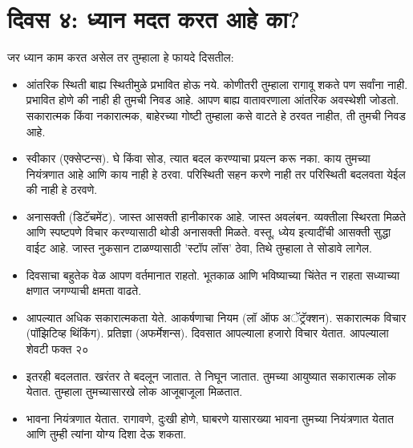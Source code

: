 \section*{दिवस ४: ध्यान मदत करत आहे का?}
जर ध्यान काम करत असेल तर तुम्हाला हे फायदे दिसतील:
\begin{itemize}
 \item आंतरिक स्थिती बाह्य स्थितीमुळे प्रभावित होऊ नये. कोणीतरी तुम्हाला रागावू शकते पण सर्वांना नाही. प्रभावित होणे की नाही ही तुमची निवड आहे. आपण बाह्य वातावरणाला आंतरिक अवस्थेशी जोडतो. सकारात्मक किंवा नकारात्मक, बाहेरच्या गोष्टी तुम्हाला कसे वाटते हे ठरवत नाहीत, ती तुमची निवड आहे.
 \item स्वीकार (एक्सेप्टन्स). घे किंवा सोड, त्यात बदल करण्याचा प्रयत्न करू नका. काय तुमच्या नियंत्रणात आहे आणि काय नाही हे ठरवा. परिस्थिती सहन करणे नाही तर परिस्थिती बदलवता येईल की नाही हे ठरवणे.
 \item  अनासक्ती (डिटॅचमेंट). जास्त आसक्ती हानीकारक आहे. जास्त अवलंबन. व्यक्तीला स्थिरता मिळते आणि स्पष्टपणे विचार करण्यासाठी थोडी अनासक्ती मिळते. वस्तू, ध्येय इत्यादींची आसक्ती सुद्धा वाईट आहे. जास्त नुकसान टाळण्यासाठी 'स्टॉप लॉस' ठेवा, तिथे तुम्हाला ते सोडावे लागेल.
 \item  दिवसाचा बहुतेक वेळ आपण वर्तमानात राहतो. भूतकाळ आणि भविष्याच्या चिंतेत न राहता सध्याच्या क्षणात जगण्याची क्षमता वाढते.
 \item  आपल्यात अधिक सकारात्मकता येते. आकर्षणाचा नियम (लॉ ऑफ अॅट्रॅक्शन). सकारात्मक विचार (पॉझिटिव्ह थिंकिंग). प्रतिज्ञा (अफर्मेशन्स). दिवसात आपल्याला हजारो विचार येतात. आपल्याला शेवटी फक्त २०%
 \item  इतरही बदलतात. खरंतर ते बदलून जातात. ते निघून जातात. तुमच्या आयुष्यात सकारात्मक लोक येतात. तुम्हाला तुमच्यासारखे लोक आजूबाजूला मिळतात.
 \item  भावना नियंत्रणात येतात. रागावणे, दुःखी होणे, घाबरणे यासारख्या भावना तुमच्या नियंत्रणात येतात आणि तुम्ही त्यांना योग्य दिशा देऊ शकता.
\end{itemize}
